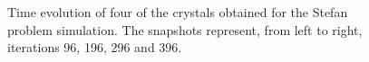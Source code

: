 \begin{figure}[ht!]
\begin{center}
{}
\caption{Time evolution of four of the crystals obtained for the Stefan problem simulation. The snapshots represent, from left to right, iterations 96, 196, 296 and 396.} \label{fig:stefan_evolution}
\end{center}
\end{figure}